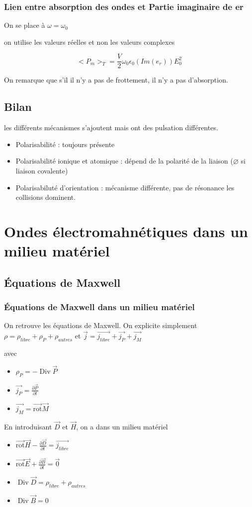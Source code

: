 \documentclass[french]{yLectureNote}
\renewcommand{\vec}{\overrightarrow}
\DeclareMathOperator{\Div}{Div}
\newcommand{\rot}{\vec{\mathrm{rot}}}
\begin{document}
\subsection{Lien entre absorption des ondes et Partie imaginaire de er}
On se place à $\omega = \omega_0$

on utilise les valeurs réelles et non les valeurs complexes
\begin{theorem}
    $$<P_m>_T = \frac{V}{2}\omega_0 \epsilon_0 (Im(e_r))E_0^2$$
\end{theorem}
On remarque que s'il il n'y a pas de frottement, il n'y a pas d'absorption.
\section{Bilan}
les différents mécanismes s'ajoutent mais ont des pulsation différentes.
\begin{itemize}
    \item Polarisabilité : toujours présente
    \item Polarisabilité ionique et atomique  : dépend de la polarité de la liaison ($\varnothing$ si liaison covalente)
    \item Polarisabiluté d'orientation : mécanisme différente, pas de résonance les collisions dominent.
\end{itemize}
\chapter{Ondes électromahnétiques dans un milieu matériel}
\section{Équations de Maxwell}
\subsection{Équations de Maxwell dans un milieu matériel}
On retrouve les équations de Maxwell. On explicite simplement $\rho = \rho_{libre}+\rho_P+\rho_{autres}$ et $\vec{j} = \vec{j_{libre}}+\vec{j_P}+\vec{j_M}$

avec 
\begin{itemize}
    \item $\rho_P = -\Div \vec{P}$
    \item $\vec{j_P} = \frac{\partial \vec{P}}{\partial t}$
    \item $\vec{j_M} = \rot \vec{M}$
\end{itemize}
En introduisant $\vec{D}$ et $\vec{H}$, on a dans un milieu matériel
\begin{itemize}
    \item $\rot \vec{H} - \frac{\partial \vec{D}}{\partial t}=\vec{j_{libre}}$
    \item $\rot \vec{E}+\frac{\partial \vec{B}}{\partial t} = \vec{0}$
    \item $\Div \vec{D} = \rho_{libre}+\rho_{autres}$
    \item $\Div \vec{B} = 0$
\end{itemize}
\end{document}
